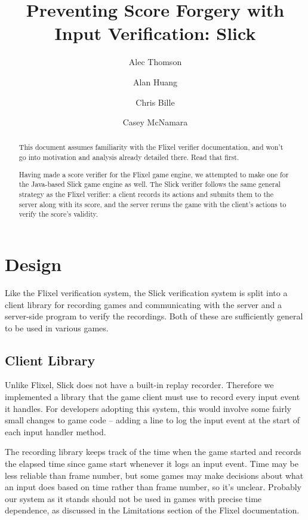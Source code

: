\documentclass [11pt, twocolumn] {article}
\begin{document}
 

\title { Preventing Score Forgery with Input Verification: Slick } 
\author{ Alec Thomson \and Alan Huang \and Chris Bille \and Casey McNamara}
\date {}

\maketitle 

\begin{abstract}
This document assumes familiarity with the Flixel verifier documentation, and won't go into motivation and analysis already detailed there.  Read that first.

Having made a score verifier for the Flixel game engine, we attempted to make one for the Java-based Slick game engine as well.  The Slick verifier follows the same general strategy as the Flixel verifier: a client records its actions and submits them to the server along with its score, and the server reruns the game with the client's actions to verify the score's validity.  
\end{abstract}

\section { Design } 
\label{sec:design}

Like the Flixel verification system, the Slick verification system is split into a client library for recording games and communicating with the server and a server-side program to verify the recordings.  Both of these are sufficiently general to be used in various games.

\subsection { Client Library } 

Unlike Flixel, Slick does not have a built-in replay recorder.  Therefore we implemented a library that the game client must use to record every input event it handles.  For developers adopting this system, this would involve some fairly small changes to game code -- adding a line to log the input event at the start of each input handler method.

The recording library keeps track of the time when the game started and records the elapsed time since game start whenever it logs an input event.  Time may be less reliable than frame number, but some games may make decisions about what an input does based on time rather than frame number, so it's unclear.  Probably our system as it stands should not be used in games with precise time dependence, as discussed in the Limitations section of the Flixel documentation.
\end{document}
